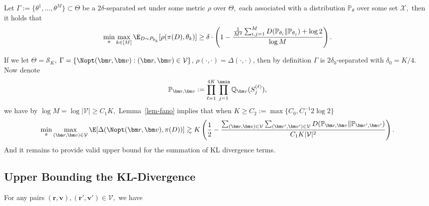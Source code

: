 \documentclass[10pt, letterpaper]{article}
\begin{document}
\begin{lemma}\label{lem-fano} Let $ \Gamma:=  \{\theta^1,\dots, \theta^M\}\subset \Theta$ be a $2\delta$-separated set under some metric $\rho$ over $\Theta,$ each associated with a distribution $\mathbb{P}_{\theta}$ over some set $\mathcal{X},$ then it holds that \begin{align*}
    \min_{\pi} \max_{k\in [M]}\E_{D\sim P_{\theta_k}}[\rho(\pi(D),\theta_k) ] \geq \delta \cdot\left(1 - \frac{\frac{1}{M^2}\sum_{i,j = 1}^M D(\mathbb{P}_{\theta_i}\lVert \mathbb{P}_{\theta_j})  +\log 2}{\log M}\right).
\end{align*}
\end{lemma}

If we let $\Theta = \mathcal{S}_K$, $\Gamma = \{\Nopt(\bm r, \bm v): (\bm r, \bm v) \in \mathcal{V}\}$, $\rho(\cdot,\cdot) = \Delta(\cdot,\cdot)$, then by definition $\Gamma$ is $2\delta_0$-separated with $\delta_0 = K/4$. Now denote 
$$\mathbb{P}_{\bm r, \bm v}: = \prod_{\ell=1}^{4K}\prod_{j = 1}^{\nmin} \mathbb{Q}_{\bm v}(S_{j}^{(\ell)}), $$ 
we have by $\log M = \log \lvert \mathcal{V}\rvert \geq C_1K,$ Lemma~\ref{lem-fano} implies that when $K\geq C_2:=\max\{C_0, C_1^{-1}2\log 2\} $ \begin{align*}
        \min_{\pi}\max_{(\bm r, \bm v) \in \mathcal{V}} \E[ \Delta (\Nopt(\bm r, \bm v),\pi (D))] \gtrsim  K\left(\frac{1}{2} - \frac{\sum_{(\bm r, \bm v)\in \mathcal{V}}\sum_{(\bm r', \bm v')\in \mathcal{V}} D(\mathbb{P}_{\bm r, \bm v} \lVert \mathbb{P}_{\bm r', \bm v'}) }{C_1 K\lvert \mathcal V \rvert^2} \right).
\end{align*}
And it remains to provide valid upper bound for the summation of KL divergence terms.

\subsection{Upper Bounding the KL-Divergence}

For any pairs $(\bm r, \bm v),(\bm r', \bm v') \in \mathcal{V},$ we have 
\end{document}
